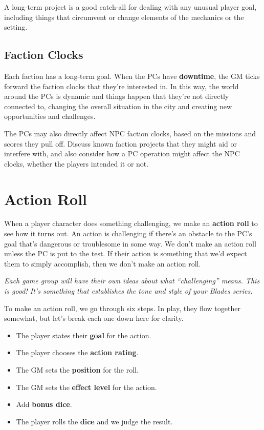 \documentclass[11pt,oneside]{book}
\begin{document}
A long-term project is a good catch-all for dealing with any unusual player goal, including things that circumvent or change elements of the mechanics or the setting.

\section{Faction Clocks}

Each faction has a long-term goal. When the PCs have \textbf{downtime}, the GM ticks forward the faction clocks that they’re interested in. In this way, the world around the PCs is dynamic and things happen that they’re not directly connected to, changing the overall situation in the city and creating new opportunities and challenges.

The PCs may also directly affect NPC faction clocks, based on the missions and scores they pull off. Discuss known faction projects that they might aid or interfere with, and also consider how a PC operation might affect the NPC clocks, whether the players intended it or not.

\chapter{Action Roll}

When a player character does something challenging, we make an \textbf{action roll} to see how it turns out. An action is challenging if there’s an obstacle to the PC’s goal that’s dangerous or troublesome in some way. We don’t make an action roll unless the PC is put to the test. If their action is something that we’d expect them to simply accomplish, then we don’t make an action roll.

\emph{Each game group will have their own ideas about what “challenging” means. This is good! It’s something that establishes the tone and style of your Blades series.}

To make an action roll, we go through six steps. In play, they flow together somewhat, but let’s break each one down here for clarity.

\begin{itemize}
	\item The player states their \textbf{goal} for the action.
	\item The player chooses the \textbf{action rating}.
	\item The GM sets the \textbf{position} for the roll.
	\item The GM sets the \textbf{effect level} for the action.
	\item Add \textbf{bonus dice}.
	\item The player rolls the \textbf{dice} and we judge the result.
\end{itemize}
\end{document}
